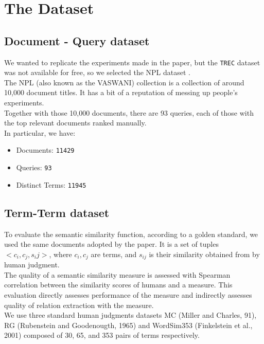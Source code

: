 \documentclass[letterpaper, 10 pt, conference]{ieeeconf}  %
\begin{document}
\section{The Dataset}
\subsection{Document - Query dataset}
We wanted to replicate the experiments made in the paper, but the \texttt{TREC} dataset was not available for free, so we selected the NPL dataset \cite{c2}.\\
The NPL (also known as the VASWANI) collection is a collection of around 10,000 document titles. It has a bit of a reputation of messing up people's experiments.\\
Together with those 10,000 documents, there are 93 queries, each of those with the top relevant documents ranked manually.\\
In particular, we have:
\begin{itemize}
    \item Documents: \texttt{11429}
    \item Queries: \texttt{93}
    \item Distinct Terms: \texttt{11945}
\end{itemize}
\subsection{Term-Term dataset}
To evaluate the semantic similarity function, according to a golden standard, we used the same documents adopted by the paper. It is a set of tuples $<c_i, c_j, s_ij>$, where $c_i, c_j$ are terms, and $s_{ij}$ is their similarity obtained from by human judgment.\\
The quality of a semantic similarity measure is assessed with Spearman correlation between the similarity scores of humans and a measure. This evaluation directly assesses performance of the measure and indirectly assesses quality of relation extraction with the measure.\\
We use three standard human judgments datasets MC (Miller and Charles, 91), RG (Rubenstein and Goodenougth, 1965) and WordSim353 (Finkelstein et al., 2001) composed of 30, 65, and 353 pairs of terms respectively.
\end{document}
